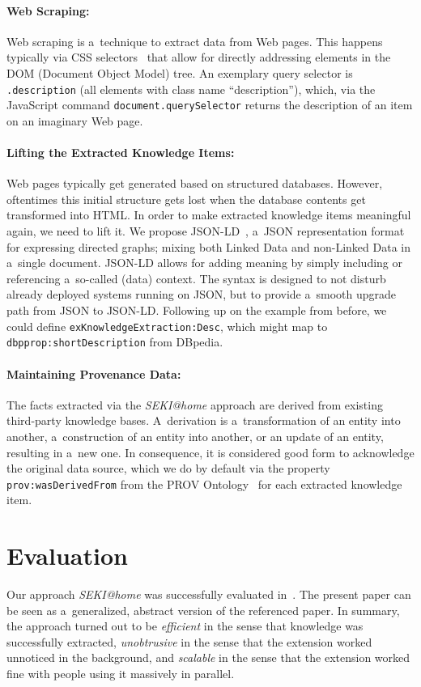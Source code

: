 \documentclass[runningheads,a4paper]{llncs}
\begin{document}
\paragraph{Web Scraping:}
Web scraping is a~technique to extract data from Web pages.
This happens typically via CSS selectors~\cite{hunt2012}
that allow for directly addressing elements in the DOM (Document Object Model) tree.
An exemplary query selector is \texttt{.description}
(all elements with class name ``description''),
which, via the JavaScript command \texttt{document.querySelector}
returns the description of an item on an imaginary Web page.

\paragraph{Lifting the Extracted Knowledge Items:} \label{sec:lifting}
Web pages typically get generated based on structured databases.
However, oftentimes this initial structure gets lost
when the database contents get transformed into HTML.
In order to make extracted knowledge items meaningful again,
we need to lift it.
We propose JSON-LD~\cite{sporny2012}, a~JSON representation format
for expressing directed graphs;
mixing both Linked Data and non-Linked Data in a~single document.
JSON-LD allows for adding meaning
by simply including or referencing a~so-called (data) context.
The syntax is designed to not disturb already deployed systems running on JSON,
but to provide a~smooth upgrade path from JSON to JSON-LD.
Following up on the example from before, we could define \texttt{exKnowledgeExtraction:Desc},
which might map to \texttt{dbpprop:shortDescription} from DBpedia.

\paragraph{Maintaining Provenance Data:}
The facts extracted via the \emph{SEKI@home} approach
are derived from existing third-party knowledge bases.
A~derivation is a~transformation of an entity into another,
a~construction of an entity into another, or an update of an entity,
resulting in a~new one.
In consequence, it is considered good form to acknowledge the original data source,
which we do by default via the property \texttt{prov:wasDerivedFrom}
from the PROV Ontology~\cite{lebo2012} for each extracted knowledge item.

\section{Evaluation} \label{sec:evaluation}
Our approach \emph{SEKI@home} was successfully evaluated in~\cite{Steiner2012SEKIatHome}.
The present paper can be seen as a~generalized, abstract version of the referenced paper.
In summary, the approach turned out to be
\emph{efficient} in the sense that knowledge was successfully extracted, \emph{unobtrusive} in the sense that the extension worked unnoticed in the background, and \emph{scalable} in the sense that the extension worked fine with people using it massively in parallel.
\end{document}
